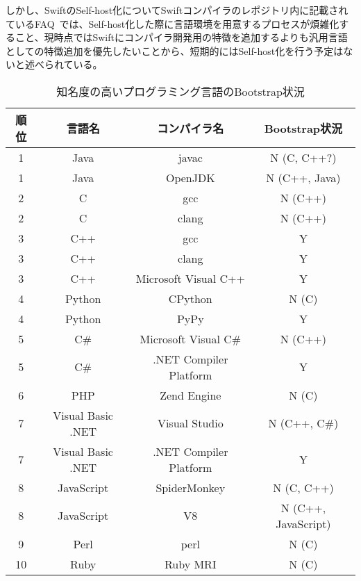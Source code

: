 しかし、SwiftのSelf-host化についてSwiftコンパイラのレポジトリ内に記載されているFAQ~\cite{swift-faq}では、Self-host化した際に言語環境を用意するプロセスが煩雑化すること、現時点ではSwiftにコンパイラ開発用の特徴を追加するよりも汎用言語としての特徴追加を優先したいことから、短期的にはSelf-host化を行う予定はないと述べられている。

\begin{table}[hb]
    \begin{center}
        \caption{知名度の高いプログラミング言語のBootstrap状況}
        \begin{tabular}{|c|c|c|c|}
            \hline
            順位 & 言語名 & コンパイラ名 & Bootstrap状況 \\
            \hline
            1 & Java & javac & N (C, C++?) \\
            \hline
            1 & Java & OpenJDK & N (C++, Java) \\
            \hline
            2 & C & gcc & N (C++) \\
            \hline
            2 & C & clang & N (C++) \\
            \hline
            3 & C++ & gcc & Y \\
            \hline
            3 & C++ & clang & Y \\
            \hline
            3 & C++ & Microsoft Visual C++ & Y \\
            \hline
            4 & Python & CPython & N (C) \\
            \hline
            4 & Python & PyPy & Y \\
            \hline
            5 & C\# & Microsoft Visual C\# & N (C++) \\
            \hline
            5 & C\# & .NET Compiler Platform & Y \\
            \hline
            6 & PHP & Zend Engine & N (C) \\
            \hline
            7 & Visual Basic .NET & Visual Studio & N (C++, C\#) \\
            \hline
            7 & Visual Basic .NET & .NET Compiler Platform & Y \\
            \hline
            8 & JavaScript & SpiderMonkey & N (C, C++) \\
            \hline
            8 & JavaScript & V8 & N (C++, JavaScript) \\
            \hline
            9 & Perl & perl & N (C) \\
            \hline
            10 & Ruby & Ruby MRI & N (C) \\

\end{tabular}
\end{center}
\end{table}
